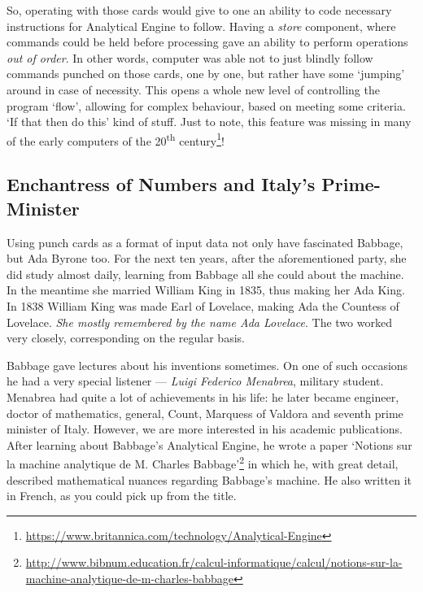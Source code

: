 \documentclass{report}
\begin{document}
            So, operating with those cards would give to one an ability to code necessary instructions for Analytical Engine to follow. Having a \emph{store} component, 
            where commands could be held before processing gave an ability to perform operations \emph{out of order}. In other words, computer was able not to just blindly
            follow commands punched on those cards, one by one, but rather have some `jumping' around in case of necessity. This opens a whole new level of controlling the
            program `flow', allowing for complex behaviour, based on meeting some criteria. `If that then do this' kind of stuff. Just to note, this feature was missing
            in many of the early computers of the 20\textsuperscript{th} century\footnote{\href{https://www.britannica.com/technology/Analytical-Engine}
            {https://www.britannica.com/technology/Analytical-Engine}}! \par

            \subsection{Enchantress of Numbers and Italy's Prime-Minister}

            Using punch cards as a format of input data not only have fascinated Babbage, but Ada Byrone too. For the next ten years, after the aforementioned party, she
            did study almost daily, learning from Babbage all she could about the machine. In the meantime she married William King in 1835, thus making her Ada King. In 1838
            William King was made Earl of Lovelace, making Ada the Countess of Lovelace. \emph{She mostly remembered by the name Ada Lovelace}. The two worked very closely,
            corresponding on the regular basis. \par

            Babbage gave lectures about his inventions sometimes. On one of such occasions he had a very special listener --- \emph{Luigi Federico Menabrea}, military student. Menabrea
            had quite a lot of achievements in his life: he later became engineer, doctor of mathematics, general, Count, Marquess of Valdora and seventh prime minister of Italy. 
            However, we are more interested in his academic publications. After learning about Babbage's Analytical Engine, he wrote a paper 
            `Notions sur la machine analytique de M. Charles Babbage'\footnote{\href{http://www.bibnum.education.fr/calcul-informatique/calcul/notions-sur-la-machine-analytique-de-m-charles-babbage}
            {http://www.bibnum.education.fr/calcul-informatique/calcul/notions-sur-la-machine-analytique-de-m-charles-babbage}} in which he, with great detail, described mathematical
            nuances regarding Babbage's machine. He also written it in French, as you could pick up from the title. \par
\end{document}
